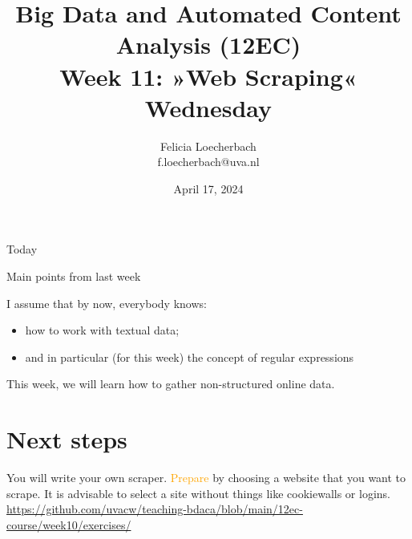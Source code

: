 \documentclass[compress]{beamer}
\begin{document}
\title[Big Data and Automated Content Analysis]{\textbf{Big Data and Automated Content Analysis (12EC)} 
\\Week 11: »Web Scraping«
\\Wednesday}
\author[Felicia Loecherbach]{Felicia Loecherbach\\ \footnotesize{f.loecherbach@uva.nl \\}}
\date{April 17, 2024}


\begin{frame}{}
	\titlepage
\end{frame}

\begin{frame}{Today}
	\tableofcontents
\end{frame}





\begin{frame}{Main points from last week}

\begin{alertblock}{I assume that by now, everybody knows:}
\begin{itemize}
\item how to work with textual data;
\item and in particular (for this week) the concept of regular expressions
\end{itemize}
\end{alertblock}
\end{frame}


\begin{frame}[standout]
This week, we will learn how to gather non-structured online data.
\end{frame}






\section{Next steps}

\begin{frame}[standout]
You will write your own scraper. \textcolor{orange}{Prepare} by choosing a website that you want to scrape. It is advisable to select a site without things like cookiewalls or logins.
\large{\url{https://github.com/uvacw/teaching-bdaca/blob/main/12ec-course/week10/exercises/}}
\end{frame}





\begin{frame}
	\printbibliography
\end{frame}
\end{document}

